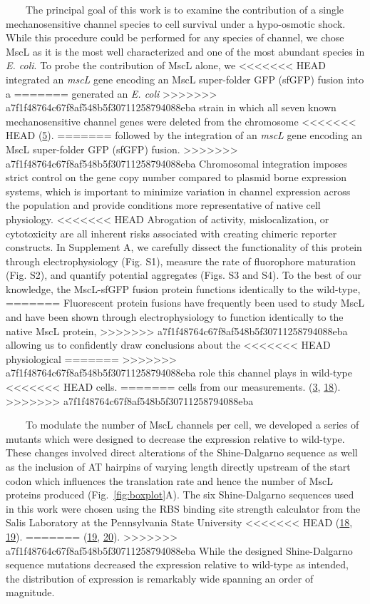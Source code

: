 ~~~~The
principal
goal
of
this
work
is to
examine
the
contribution
of a
single
mechanosensitive
channel
species
to
cell
survival
under
a
hypo-osmotic
shock.
While
this
procedure
could
be
performed
for
any
species
of
channel,
we
chose
MscL
as it
is the
most
well
characterized
and
one of
the
most
abundant
species
in
\emph{E.
coli}.
To
probe
the
contribution
of
MscL
alone,
we
<<<<<<< HEAD
integrated
an
\emph{mscL}
gene
encoding
an
MscL
super-folder
GFP
(sfGFP)
fusion
into a
=======
generated
an
\emph{E.
coli}
>>>>>>> a7f1f48764c67f8af548b5f30711258794088eba
strain
in
which
all
seven
known
mechanosensitive
channel
genes
were
deleted
from
the
chromosome
<<<<<<< HEAD
(\protect\hyperlink{ref-edwards2012}{5}).
=======
followed
by the
integration
of an
\emph{mscL}
gene
encoding
an
MscL
super-folder
GFP
(sfGFP)
fusion.
>>>>>>> a7f1f48764c67f8af548b5f30711258794088eba
Chromosomal
integration
imposes
strict
control
on the
gene
copy
number
compared
to
plasmid
borne
expression
systems,
which
is
important
to
minimize
variation
in
channel
expression
across
the
population
and
provide
conditions
more
representative
of
native
cell
physiology.
<<<<<<< HEAD
Abrogation
of
activity,
mislocalization,
or
cytotoxicity
are
all
inherent
risks
associated
with
creating
chimeric
reporter
constructs.
In
Supplement
A, we
carefully
dissect
the
functionality
of
this
protein
through
electrophysiology
(Fig.
S1),
measure
the
rate
of
fluorophore
maturation
(Fig.
S2),
and
quantify
potential
aggregates
(Figs.
S3 and
S4).
To the
best
of our
knowledge,
the
MscL-sfGFP
fusion
protein
functions
identically
to the
wild-type,
=======
Fluorescent
protein
fusions
have
frequently
been
used
to
study
MscL
and
have
been
shown
through
electrophysiology
to
function
identically
to the
native
MscL
protein,
>>>>>>> a7f1f48764c67f8af548b5f30711258794088eba
allowing
us to
confidently
draw
conclusions
about
the
<<<<<<< HEAD
physiological
=======
>>>>>>> a7f1f48764c67f8af548b5f30711258794088eba
role
this
channel
plays
in
wild-type
<<<<<<< HEAD
cells.
=======
cells
from
our
measurements.
(\protect\hyperlink{ref-bialecka-fornal2012}{3},
\protect\hyperlink{ref-norman2005}{18}).
>>>>>>> a7f1f48764c67f8af548b5f30711258794088eba

~~~~To
modulate
the
number
of
MscL
channels
per
cell,
we
developed
a
series
of
mutants
which
were
designed
to
decrease
the
expression
relative
to
wild-type.
These
changes
involved
direct
alterations
of the
Shine-Dalgarno
sequence
as
well
as the
inclusion
of AT
hairpins
of
varying
length
directly
upstream
of the
start
codon
which
influences
the
translation
rate
and
hence
the
number
of
MscL
proteins
produced
(Fig.~\ref{fig:boxplot}A).
The
six
Shine-Dalgarno
sequences
used
in
this
work
were
chosen
using
the
RBS
binding
site
strength
calculator
from
the
Salis
Laboratory
at the
Pennsylvania
State
University
<<<<<<< HEAD
(\protect\hyperlink{ref-espahborujeni2014}{18},
\protect\hyperlink{ref-salis2009}{19}).
=======
(\protect\hyperlink{ref-espahborujeni2014}{19},
\protect\hyperlink{ref-salis2009}{20}).
>>>>>>> a7f1f48764c67f8af548b5f30711258794088eba
While
the
designed
Shine-Dalgarno
sequence
mutations
decreased
the
expression
relative
to
wild-type
as
intended,
the
distribution
of
expression
is
remarkably
wide
spanning
an
order
of
magnitude.

